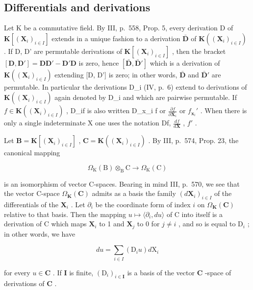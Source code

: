 \subsection{Differentials and derivations}

Let K be a commutative field. By III, p.~558, Prop. 5, every derivation D of \(\mathbf{K}[(\mathbf{X}_i)_{i\in I}]\) extends in a unique fashion to a derivation \(\bar{\mathbf{D}}\) of \(\mathbf{K}((\mathbf{X}_i)_{i\in I})\) . If D, D' are permutable derivations of \(\mathbf{K}[(\mathbf{X}_i)_{i\in I}]\) , then the bracket \([\mathbf{D},\mathbf{D}'] = \mathbf{DD}' - \mathbf{D}'\mathbf{D}\) is zero, hence \([\bar{\mathbf{D}},\bar{\mathbf{D}}']\) which is a derivation of \(\mathbf{K}((\mathbf{X}_i)_{i\in I})\) extending {[}D, D'{]} is zero; in other words, \(\bar{\mathbf{D}}\) and \(\bar{\mathbf{D}}'\) are permutable. In particular the derivations D\_i (IV, p.~6) extend to derivations of \(\mathbf{K}((\mathbf{X}_i)_{i\in I})\) again denoted by D\_i and which are pairwise permutable. If \(f\in \mathbf{K}((\mathbf{X}_i)_{i\in I})\) , D\_if is also written D\_x\_i f or \(\frac{\partial f}{\partial\mathbf{X}_i}\) or \(f_{\mathbf{x}_i}'\) . When there is only a single indeterminate X one uses the notation Df, \(\frac{df}{d\mathbf{X}}\) , \(f'\) .

Let \(\mathbf{B} = \mathbf{K}[(\mathbf{X}_i)_{i \in I}]\) , \(\mathbf{C} = \mathbf{K}((\mathbf{X}_i)_{i \in I})\) . By III, p.~574, Prop. 23, the canonical mapping

\[
\Omega_ {\mathrm{K}} (\mathrm{B}) \otimes_ {\mathrm{B}} \mathrm{C} \rightarrow \Omega_ {\mathrm{K}} (\mathrm{C})
\]

is an isomorphism of vector C-spaces. Bearing in mind III, p.~570, we see that the vector C-space \(\Omega_{\mathbf{K}}(\mathbf{C})\) admits as a basis the family \((d\mathbf{X}_i)_{i\in I}\) of the differentials of the \(\mathbf{X}_i\) . Let \(\partial_i\) be the coordinate form of index \(i\) on \(\Omega_{\mathbf{K}}(\mathbf{C})\) relative to that basis. Then the mapping \(u\mapsto \langle \partial_i,du\rangle\) of C into itself is a derivation of C which maps \(\mathbf{X}_i\) to 1 and \(\mathbf{X}_j\) to 0 for \(j\neq i\) , and so is equal to \(\mathrm{D}_i\) ; in other words, we have

\[
d u = \sum_ {i \in I} \left(\mathrm{D} _ {i} u\right) d \mathrm{X} _ {i}\tag{1}
\]

for every \(u \in \mathbf{C}\) . If \(\mathbf{I}\) is finite, \((\mathrm{D}_i)_{i \in \mathbf{I}}\) is a basis of the vector \(\mathbf{C}\) -space of derivations of \(\mathbf{C}\) .

